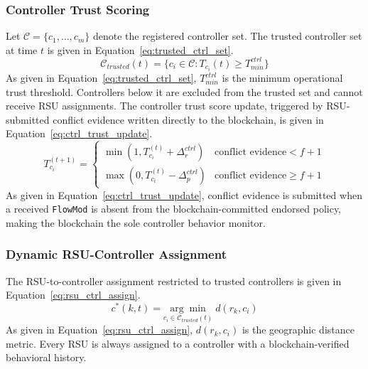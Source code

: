 \documentclass[12pt, a4paper]{report}
\begin{document}
{{\subsubsection{Controller Trust Scoring}
Let $\mathcal{C}{=}\{c_1,\ldots,c_m\}$ denote the
registered controller set. The trusted controller set
at time $t$ is given in
Equation~\eqref{eq:trusted_ctrl_set}.
\begin{equation}
\mathcal{C}_{trusted}(t){=}
\{c_i\in\mathcal{C}:T_{c_i}(t)\geq T_{min}^{ctrl}\}
\label{eq:trusted_ctrl_set}
\end{equation}
As given in Equation~\eqref{eq:trusted_ctrl_set},
$T_{min}^{ctrl}$ is the minimum operational trust
threshold. Controllers below it are excluded from the
trusted set and cannot receive \ac{RSU} assignments.
The controller trust score update, triggered by
\ac{RSU}-submitted conflict evidence written directly
to the blockchain, is given in
Equation~\eqref{eq:ctrl_trust_update}.
\begin{equation}
T_{c_i}^{(t+1)}{=}
\begin{cases}
\min(1,T_{c_i}^{(t)}{+}\Delta_r^{ctrl}) &
\text{conflict evidence}{<}f{+}1\\
\max(0,T_{c_i}^{(t)}{-}\Delta_p^{ctrl}) &
\text{conflict evidence}{\geq}f{+}1
\end{cases}
\label{eq:ctrl_trust_update}
\end{equation}
As given in Equation~\eqref{eq:ctrl_trust_update},
conflict evidence is submitted when a received
\texttt{FlowMod} is absent from the blockchain-committed
endorsed policy, making the blockchain the sole
controller behavior monitor.



\subsubsection{Dynamic RSU-Controller Assignment}
The \ac{RSU}-to-controller assignment restricted to
trusted controllers is given in
Equation~\eqref{eq:rsu_ctrl_assign}.
\begin{equation}
c^*(k,t){=}
\underset{c_i\in\mathcal{C}_{trusted}(t)}
{\arg\min}\;d(r_k,c_i)
\label{eq:rsu_ctrl_assign}
\end{equation}
As given in Equation~\eqref{eq:rsu_ctrl_assign},
$d(r_k,c_i)$ is the geographic distance metric. Every
\ac{RSU} is always assigned to a controller with a
blockchain-verified behavioral history.



}}
\end{document}
